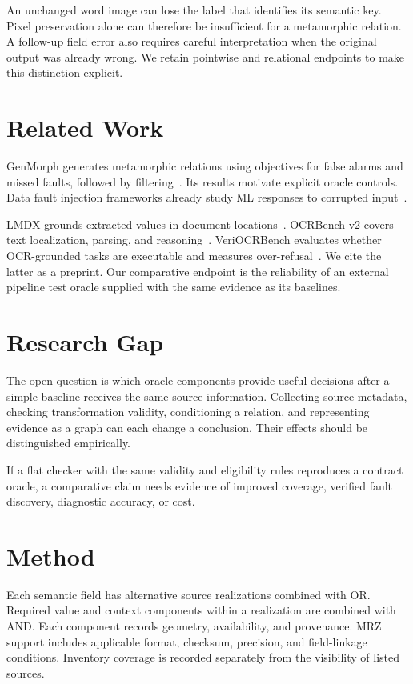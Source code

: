 \documentclass[sigconf,review,anonymous]{acmart}
\begin{document}
An unchanged word image can lose the label that identifies its semantic key. Pixel preservation alone can therefore be insufficient for a metamorphic relation. A follow-up field error also requires careful interpretation when the original output was already wrong. We retain pointwise and relational endpoints to make this distinction explicit.

\section{Related Work}
GenMorph generates metamorphic relations using objectives for false alarms and missed faults, followed by filtering~\cite{ayerdi2024genmorph}. Its results motivate explicit oracle controls. Data fault injection frameworks already study ML responses to corrupted input~\cite{nurminen2019faultinjection}.

LMDX grounds extracted values in document locations~\cite{perot2024lmdx}. OCRBench v2 covers text localization, parsing, and reasoning~\cite{fu2025ocrbenchv2}. VeriOCRBench evaluates whether OCR-grounded tasks are executable and measures over-refusal~\cite{zhou2026veriocrbench}. We cite the latter as a preprint. Our comparative endpoint is the reliability of an external pipeline test oracle supplied with the same evidence as its baselines.

\section{Research Gap}
The open question is which oracle components provide useful decisions after a simple baseline receives the same source information. Collecting source metadata, checking transformation validity, conditioning a relation, and representing evidence as a graph can each change a conclusion. Their effects should be distinguished empirically.

If a flat checker with the same validity and eligibility rules reproduces a contract oracle, a comparative claim needs evidence of improved coverage, verified fault discovery, diagnostic accuracy, or cost.

\section{Method}
Each semantic field has alternative source realizations combined with OR. Required value and context components within a realization are combined with AND. Each component records geometry, availability, and provenance. MRZ support includes applicable format, checksum, precision, and field-linkage conditions. Inventory coverage is recorded separately from the visibility of listed sources.
\end{document}
